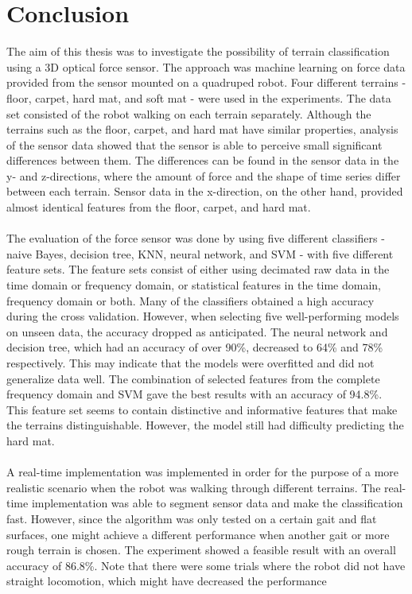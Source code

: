 \documentclass[USenglish]{ifimaster}  %
\begin{document}
\section{Conclusion}
The aim of this thesis was to investigate the possibility of terrain classification using a 3D optical force sensor. The approach was machine learning on force data provided from the sensor mounted on a quadruped robot. Four different terrains - floor, carpet, hard mat, and soft mat - were used in the experiments. The data set consisted of the robot walking on each terrain separately. Although the terrains such as the floor, carpet, and hard mat have similar properties, analysis of the sensor data showed that the sensor is able to perceive small significant differences between them. The differences can be found in the sensor data in the y- and z-directions, where the amount of force and the shape of time series differ between each terrain. Sensor data in the x-direction, on the other hand, provided almost identical features from the floor, carpet, and hard mat.
\\
\\
The evaluation of the force sensor was done by using five different classifiers - naive Bayes, decision tree, KNN, neural network, and SVM - with five different feature sets. The feature sets consist of either using decimated raw data in the time domain or frequency domain, or statistical features in the time domain, frequency domain or both. Many of the classifiers obtained a high accuracy during the cross validation. However, when selecting five well-performing models on unseen data, the accuracy dropped as anticipated. The neural network and decision tree, which had an accuracy of over 90\%, decreased to 64\% and 78\% respectively. This may indicate that the models were overfitted and did not generalize data well. The combination of selected features from the complete frequency domain and SVM gave the best results with an accuracy of 94.8\%. This feature set seems to contain distinctive and informative features that make the terrains distinguishable. However, the model still had difficulty predicting the hard mat. 
\\
\\
A real-time implementation was implemented in order for the purpose of a more realistic scenario when the robot was walking through different terrains. The real-time implementation was able to segment sensor data and make the classification fast. However, since the algorithm was only tested on a certain gait and flat surfaces, one might achieve a different performance when another gait or more rough terrain is chosen. The experiment showed a feasible result with an overall accuracy of 86.8\%. Note that there were some trials where the robot did not have straight locomotion, which might have decreased the performance
\end{document}
